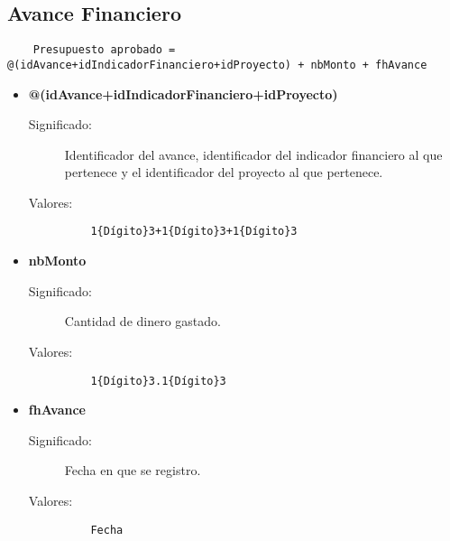 \subsection{Avance Financiero}
\label{dd:AvanceFinanciero}
\begin{lstlisting}
    Presupuesto aprobado = @(idAvance+idIndicadorFinanciero+idProyecto) + nbMonto + fhAvance
\end{lstlisting}
 \begin{itemize}

    \item \textbf{@(idAvance+idIndicadorFinanciero+idProyecto)}
      \begin{description}
        \item [Significado:] Identificador del avance, identificador del indicador financiero al que pertenece y el identificador del proyecto al que pertenece.
        \item [Valores:]{\begin{lstlisting}
	1{Dígito}3+1{Dígito}3+1{Dígito}3\end{lstlisting}}\end{description}

    \item \textbf{nbMonto}
      \begin{description}
        \item [Significado:] Cantidad de dinero gastado.
        \item [Valores:]{\begin{lstlisting}
	1{Dígito}3.1{Dígito}3\end{lstlisting}}\end{description}
 
    \item \textbf{fhAvance}
      \begin{description}
        \item [Significado:] Fecha en que se registro.
        \item [Valores:]{\begin{lstlisting}
	Fecha\end{lstlisting}}\end{description}

\end{itemize}

